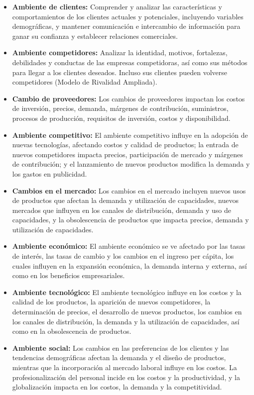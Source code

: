 \documentclass{templateNote}
\begin{document}
    \begin{itemize}
        \item \textbf{Ambiente de clientes:} Comprender y analizar las características y comportamientos de los clientes actuales y potenciales, incluyendo variables demográficas, y mantener comunicación e intercambio de información para ganar su confianza y establecer relaciones comerciales.
        \item \textbf{Ambiente competidores:} Analizar la identidad, motivos, fortalezas, debilidades y conductas de las empresas competidoras, así como sus métodos para llegar a los clientes deseados. Incluso sus clientes pueden volverse competidores (Modelo de Rivalidad Ampliada).
        \item \textbf{Cambio de proveedores:} Los cambios de proveedores impactan los costos de inversión, precios, demanda, márgenes de contribución, suministros, procesos de producción, requisitos de inversión, costos y disponibilidad.
        \item \textbf{Ambiente competitivo:} El ambiente competitivo influye en la adopción de nuevas tecnologías, afectando costos y calidad de productos; la entrada de nuevos competidores impacta precios, participación de mercado y márgenes de contribución; y el lanzamiento de nuevos productos modifica la demanda y los gastos en publicidad.
        \item \textbf{Cambios en el mercado:} Los cambios en el mercado incluyen nuevos usos de productos que afectan la demanda y utilización de capacidades, nuevos mercados que influyen en los canales de distribución, demanda y uso de capacidades, y la obsolescencia de productos que impacta precios, demanda y utilización de capacidades.
        \item \textbf{Ambiente económico:} El ambiente económico se ve afectado por las tasas de interés, las tasas de cambio y los cambios en el ingreso per cápita, los cuales influyen en la expansión económica, la demanda interna y externa, así como en los beneficios empresariales.
        \item \textbf{Ambiente tecnológico:} El ambiente tecnológico influye en los costos y la calidad de los productos, la aparición de nuevos competidores, la determinación de precios, el desarrollo de nuevos productos, los cambios en los canales de distribución, la demanda y la utilización de capacidades, así como en la obsolescencia de productos.
        \item \textbf{Ambiente social:} Los cambios en las preferencias de los clientes y las tendencias demográficas afectan la demanda y el diseño de productos, mientras que la incorporación al mercado laboral influye en los costos. La profesionalización del personal incide en los costos y la productividad, y la globalización impacta en los costos, la demanda y la competitividad.

\end{itemize}
\end{document}
